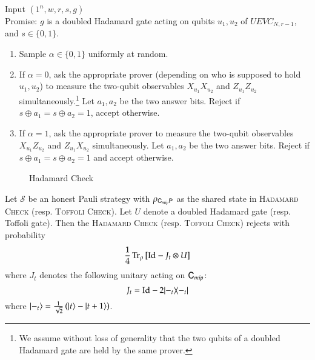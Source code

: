 \vspace{10pt}
\begin{center}
\begin{mdframed}
	Input $(1^n,w,r,s,g)$ \\
	Promise: $g$ is a doubled Hadamard gate acting on qubits $u_1,u_2$ of $UEVC_{N,r-1}$, and $s \in \{0,1\}$.
    
	\begin{enumerate}
		\item Sample $\alpha \in \{0,1\}$ uniformly at random.
		\item If $\alpha = 0$, ask the appropriate prover (depending on who is supposed to hold $u_1,u_2$) to measure the two-qubit observables $X_{u_1} X_{u_2}$ and $Z_{u_1} Z_{u_2}$ simultaneously.\footnote{We assume without loss of generality that the two qubits of a doubled Hadamard gate are held by the same prover.} Let $a_1,a_2$ be the two answer bits. Reject if $s \oplus a_1 = s \oplus a_2 = 1$, accept otherwise.
		\item If $\alpha = 1$, ask the appropriate prover to measure the two-qubit observables $X_{u_1} Z_{u_2}$ and $Z_{u_1} X_{u_2}$ simultaneously. Let $a_1,a_2$ be the two answer bits. Reject if $s \oplus a_1 = s \oplus a_2 = 1$ and accept otherwise.
	\end{enumerate}    
\end{mdframed}

\end{center}
\begin{figure}[H]
\caption{Hadamard Check}
\label{fig:hadamard_check}
\end{figure}

\begin{lemma}
\label{lem:ver_gate_check}
	Let $\mathcal{S}$ be an honest Pauli strategy with $\rho_{{\mathsf{C}}_{mip} {\mathsf{P}}}$ as the shared state in \textsc{Hadamard Check} (resp. \textsc{Toffoli Check}). Let $U$ denote a doubled Hadamard gate (resp. Toffoli gate). Then the \textsc{Hadamard Check} (resp. \textsc{Toffoli Check}) rejects with probability 
	\[
		\frac{1}{4} \operatorname{Tr}_{\rho} \left[ \mathop{\mathrm{Id}}\!\mathinner{} - J_t \otimes U \right ]
	\]
	where $J_t$ denotes the following unitary acting on ${\mathsf{C}}_{mip}$:
	\[
		J_t = \mathop{\mathrm{Id}}\!\mathinner{} - 2|-_t\rangle\! \langle -_t|
	\]
	where $|-_t\rangle = \frac{1}{\sqrt{2}} \left( |t\rangle - |t+1\rangle \right)$.
\end{lemma}

